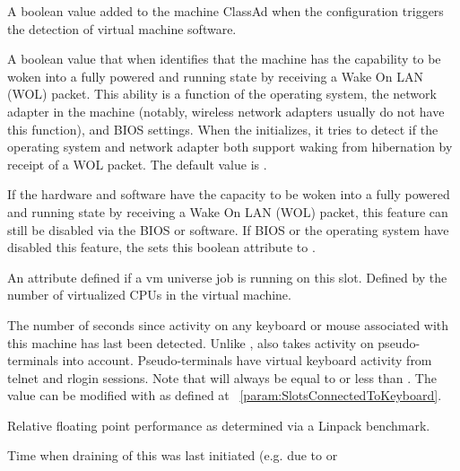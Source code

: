 \begin{description}
%
\item[\AdAttr{HasVM}:] A boolean value added to the machine ClassAd
when the configuration triggers the detection of virtual machine
software.
%
\item[\AdAttr{IsWakeAble}:] A boolean value that when  identifies
that the machine has the capability to be woken into a 
fully powered and running state by receiving a Wake On LAN (WOL) packet.
This ability is a function of the operating system, 
the network adapter in the machine 
(notably, wireless network adapters usually do not have this function),
and BIOS settings. 
When the  initializes, 
it tries to detect if the operating system and network adapter both support 
waking from hibernation by receipt of a WOL packet.
The default value is .
%
\item[\AdAttr{IsWakeEnabled}:] If the hardware and software have the capacity 
to be woken into a fully powered and running state by receiving 
a Wake On LAN (WOL) packet,
this feature can still be disabled via the BIOS or software.
If BIOS or the operating system have disabled this feature, 
the  sets this boolean attribute to .
%
\item[\AdAttr{JobVM\_VCPUS}:] An attribute defined if a vm universe job
is running on this slot.  Defined by the number of virtualized CPUs
in the virtual machine.
%
\item[\AdAttr{KeyboardIdle}:] The number of seconds since activity on any
keyboard or mouse associated with this machine has last been detected.
Unlike ,  also takes activity 
on pseudo-terminals into
account.
Pseudo-terminals have virtual keyboard activity from telnet and rlogin
sessions.  Note that  will always be equal to or
less than .
The value can be modified with 
as defined at ~\ref{param:SlotsConnectedToKeyboard}.
%
\item[\AdAttr{KFlops}:] Relative floating point performance as determined via a
Linpack benchmark.
%
\item[\AdAttr{LastDrainStartTime}:] Time when draining of this
 was last initiated (e.g. due to  or

\end{description}
